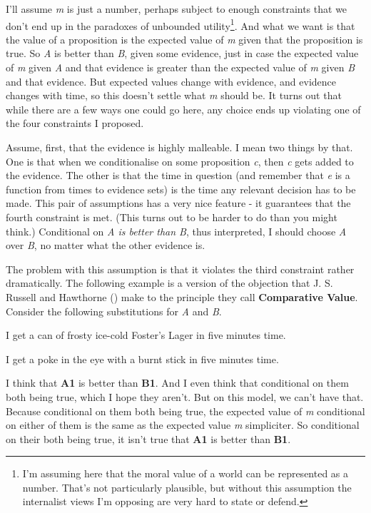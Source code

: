 \documentclass[
  10pt,
  letterpaper,
  twoside]{scrbook}
\providecommand{\tightlist}{%
  \setlength{\itemsep}{0pt}\setlength{\parskip}{0pt}}\usepackage{longtable,booktabs,array}
\begin{document}
I'll assume \emph{m} is just a number, perhaps subject to enough
constraints that we don't end up in the paradoxes of unbounded
utility\footnote{I'm assuming here that the moral value of a world can
  be represented as a number. That's not particularly plausible, but
  without this assumption the internalist views I'm opposing are very
  hard to state or defend.}. And what we want is that the value of a
proposition is the expected value of \emph{m} given that the proposition
is true. So \emph{A} is better than \emph{B}, given some evidence, just
in case the expected value of \emph{m} given \emph{A} and that evidence
is greater than the expected value of \emph{m} given \emph{B} and that
evidence. But expected values change with evidence, and evidence changes
with time, so this doesn't settle what \emph{m} should be. It turns out
that while there are a few ways one could go here, any choice ends up
violating one of the four constraints I proposed.

Assume, first, that the evidence is highly malleable. I mean two things
by that. One is that when we conditionalise on some proposition
\emph{c}, then \emph{c} gets added to the evidence. The other is that
the time in question (and remember that \emph{e} is a function from
times to evidence sets) is the time any relevant decision has to be
made. This pair of assumptions has a very nice feature - it guarantees
that the fourth constraint is met. (This turns out to be harder to do
than you might think.) Conditional on \emph{A is better than B}, thus
interpreted, I should choose \emph{A} over \emph{B}, no matter what the
other evidence is.

The problem with this assumption is that it violates the third
constraint rather dramatically. The following example is a version of
the objection that J. S. Russell and Hawthorne
() make to the
principle they call \textbf{Comparative Value}. Consider the following
substitutions for \emph{A} and \emph{B}.

\begin{description}
\tightlist
\item[A1]
I get a can of frosty ice-cold Foster's Lager in five minutes time.
\item[B1]
I get a poke in the eye with a burnt stick in five minutes time.
\end{description}

I think that \textbf{A1} is better than \textbf{B1}. And I even think
that conditional on them both being true, which I hope they aren't. But
on this model, we can't have that. Because conditional on them both
being true, the expected value of \emph{m} conditional on either of them
is the same as the expected value \emph{m} simpliciter. So conditional
on their both being true, it isn't true that \textbf{A1} is better than
\textbf{B1}.
\end{document}
